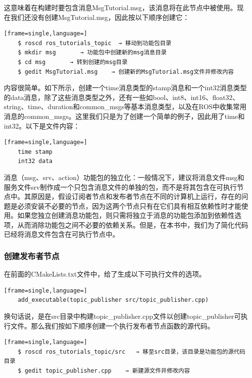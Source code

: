 \documentclass[geye,green,kindle,cn]{elegantnote}
\begin{document}
这意味着在构建时要包含消息MsgTutorial.msg，该消息将在此节点中被使用。现在我们还没有创建MsgTutorial.msg，因此按以下顺序创建它： 
\begin{lstlisting}[frame=single,language=]
    $ roscd ros_tutorials_topic  → 移动到功能包目录 
    $ mkdir msg       → 功能包中创建新的msg消息目录 
    $ cd msg       → 转到创建的msg目录 
    $ gedit MsgTutorial.msg    → 创建新的MsgTutorial.msg文件并修改内容
\end{lstlisting}

内容很简单。如下所示，创建一个time消息类型的stamp消息和一个int32消息类型的data消息，除了这些消息类型之外，还有一些如bool、int8、int16、float32、string、time、duration和common\_msgs等基本消息类型，以及在ROS中收集常用消息的common\_msgs。这里我们只是为了创建一个简单的例子，因此用了time和int32。以下是文件内容：
\begin{lstlisting}[frame=single,language=]
    time stamp 
    int32 data
\end{lstlisting}

消息（msg、srv、action）功能包的独立化：一般情况下，建议将消息文件msg和服务文件srv制作成一个只包含消息文件的单独的包，而不是将其包含在可执行节点中。其原因是，假设订阅者节点和发布者节点在不同的计算机上运行，存在的问题是必须安装不必要的节点，因为这两个节点只有在它们具有相互依赖性时才能使用。如果您独立创建消息功能包，则只需将独立于消息的功能包添加到依赖性选项，从而消除功能包之间不必要的依赖关系。但是，在本书中，我们为了简化代码已经将消息文件包含在可执行节点中。
\subsubsection{创建发布者节点}
在前面的CMakeLists.txt文件中，给了生成以下可执行文件的选项。
\begin{lstlisting}[frame=single,language=]
    add_executable(topic_publisher src/topic_publisher.cpp)
\end{lstlisting}

换句话说，是在src目录中构建topic\_publisher.cpp文件以创建topic\_publisher可执行文件。那么我们按如下顺序创建一个执行发布者节点函数的源代码。
\begin{lstlisting}[frame=single,language=]
    $ roscd ros_tutorials_topic/src   → 移至src目录，该目录是功能包的源代码目录 
    $ gedit topic_publisher.cpp    → 新建源文件并修改内容
\end{lstlisting}
\end{document}
